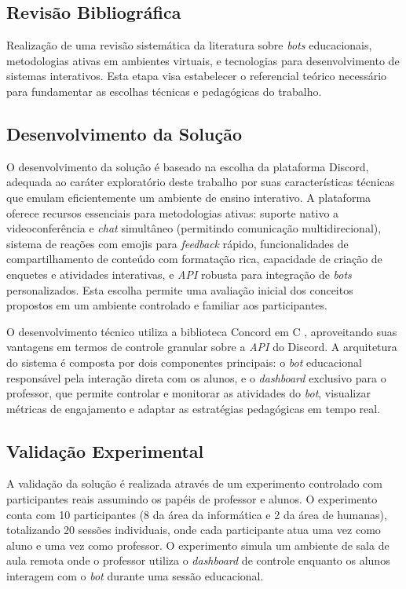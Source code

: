 \subsection{Revisão Bibliográfica}
\label{subsec:revisao-metodologia}

Realização de uma revisão sistemática da literatura sobre \textit{bots}
educacionais, metodologias ativas em ambientes virtuais, e tecnologias para
desenvolvimento de sistemas interativos. Esta etapa visa estabelecer o
referencial teórico necessário para fundamentar as escolhas técnicas e
pedagógicas do trabalho.

\subsection{Desenvolvimento da Solução}
\label{subsec:desenvolvimento-metodologia}

O desenvolvimento da solução é baseado na escolha da plataforma Discord,
adequada ao caráter exploratório deste trabalho por suas características
técnicas que emulam eficientemente um ambiente de ensino interativo. A
plataforma oferece recursos essenciais para metodologias ativas: suporte nativo
a videoconferência e \textit{chat} simultâneo (permitindo comunicação
multidirecional), sistema de reações com emojis para \textit{feedback} rápido,
funcionalidades de compartilhamento de conteúdo com formatação rica, capacidade
de criação de enquetes e atividades interativas, e \textit{API} robusta para
integração de \textit{bots} personalizados. Esta escolha permite uma avaliação
inicial dos conceitos propostos em um ambiente controlado e familiar aos
participantes.

O desenvolvimento técnico utiliza a biblioteca Concord em C \cite{muller},
aproveitando suas vantagens em termos de controle granular sobre a \textit{API}
do Discord. A arquitetura do sistema é composta por dois componentes principais:
o \textit{bot} educacional responsável pela interação direta com os alunos, e o
\textit{dashboard} exclusivo para o professor, que permite controlar e monitorar
as atividades do \textit{bot}, visualizar métricas de engajamento e adaptar as
estratégias pedagógicas em tempo real.

\subsection{Validação Experimental}
\label{subsec:validacao-metodologia}

A validação da solução é realizada através de um experimento controlado com
participantes reais assumindo os papéis de professor e alunos. O experimento
conta com 10 participantes (8 da área da informática e 2 da área de humanas),
totalizando 20 sessões individuais, onde cada participante atua uma vez como
aluno e uma vez como professor. O experimento simula um ambiente de sala de
aula remota onde o professor utiliza o \textit{dashboard} de controle enquanto
os alunos interagem com o \textit{bot} durante uma sessão educacional.

